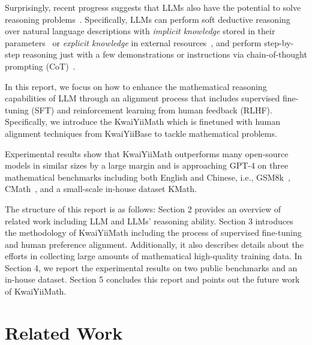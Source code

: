 \documentclass{article}
\begin{document}
Surprisingly, recent progress suggests that LLMs also have the potential to solve reasoning problems~\cite{clark2020transformers,talmor2020leap,suzgun2022challenging,wei2022chain}. Specifically, LLMs can perform soft deductive reasoning over natural language descriptions with \textit{implicit knowledge} stored in their parameters~\cite{wei2022chain,kojima2022large,fu2022complexity,shi2022language,zhang2022automatic,zhou2022teaching,diao2023active,shum2023automatic} or \textit{explicit knowledge} in external resources~\cite{wang2022iteratively,creswell2022selection,zhou2022least,press2022measuring,dua2022successive,reppert2023iterated}, and perform step-by-step reasoning just with a few demonstrations or instructions via chain-of-thought prompting (CoT)~\cite{wei2022chain}.


In this report, we focus on how to enhance the mathematical reasoning capabilities of LLM through an alignment process that includes supervised fine-tuning (SFT) and reinforcement learning from human feedback (RLHF).
Specifically, we introduce the KwaiYiiMath which is finetuned with human alignment techniques from KwaiYiiBase to tackle
mathematical problems.

Experimental results show that KwaiYiiMath outperforms many open-source models in similar sizes by a large margin and is approaching GPT-4 on three mathematical benchmarks including both English and Chinese, i.e., GSM8k~\cite{cobbe2021training}, CMath~\cite{wei2023cmath}, and a small-scale in-house dataset KMath.

The structure of this report is as follows: Section 2 provides an overview of related work including LLM and LLMs' reasoning ability.
Section 3 introduces the methodology of KwaiYiiMath including the process of supervised fine-tuning and human preference alignment.
Additionally, it also describes details about the efforts in collecting large amounts of mathematical high-quality training data.
In Section 4, we report the experimental results on two public benchmarks and an in-house dataset.
Section 5 concludes this report and points out the future work of KwaiYiiMath.


\section{Related Work}
\end{document}
